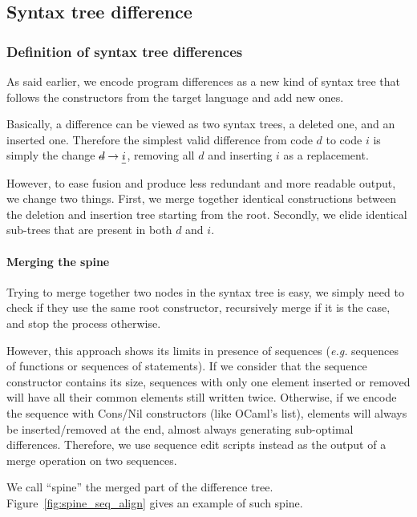 \documentclass[a4paper,11pt]{article}
\newcommand\mathst[1]{\text{\st{$#1$}}}
\newcommand\mathul[1]{\text{\ul{$#1$}}}
\newcommand\change[2]{\mathst{#1} \rightarrow \mathul{#2}}
\newcommand\gb[1]{}%
\begin{document}
\subsection{Syntax tree difference}

\subsubsection{Definition of syntax tree differences}
\label{sec:syntax_tree_def}
As said earlier, we encode program differences as a new kind of syntax
tree that follows the constructors from the target language and add
new ones.

Basically, a difference can be viewed as two syntax trees, a deleted one, and an inserted one. Therefore the simplest valid difference from code $d$ to code $i$ is simply the change $\change{d}{i}$, removing all $d$ and inserting $i$ as a replacement.

However, to ease fusion and produce less redundant and more readable output, we change two things.
First, we merge together identical constructions between the deletion and insertion tree starting from the root.
Secondly, we elide identical sub-trees that are present in both $d$ and $i$.

\paragraph{Merging the spine}
Trying to merge together two nodes in the syntax tree is easy, we simply need to check if they use the same root constructor, recursively merge if it is the case, and stop the process otherwise.

However, this approach shows its limits in presence of sequences ({\it e.g.} sequences of functions or sequences of statements). If we consider that the sequence constructor contains its size, sequences with only one element inserted or removed will have all their common elements still written twice.
Otherwise, if we encode the sequence with Cons/Nil constructors (like OCaml's list), elements will always be inserted/removed at the end, almost always generating sub-optimal differences.
Therefore, we use sequence edit scripts \cite[§3.Alignment]{miraldo2017type} \gb{I am not refining sequence edit script themselves, the algorithm to find them however is a refinement of LCS.} instead as the output of a merge operation on two sequences.

We call ``spine'' the merged part of the difference tree. Figure~\ref{fig:spine_seq_align} gives an example of such spine.
\end{document}
